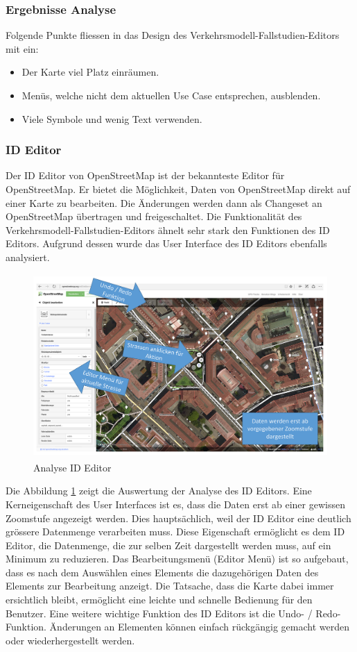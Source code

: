 \subsubsection*{Ergebnisse Analyse}
Folgende Punkte fliessen in das Design des Verkehrsmodell-Fallstudien-Editors mit ein:
\begin{itemize}
\itemsep0em
\item Der Karte viel Platz einräumen.
\item Menüs, welche nicht dem aktuellen Use Case entsprechen, ausblenden.
\item Viele Symbole und wenig Text verwenden.
\end{itemize}
\newpage
\subsubsection{ID Editor}
Der ID Editor von OpenStreetMap ist der bekannteste Editor für OpenStreetMap. Er bietet die Möglichkeit, Daten von OpenStreetMap direkt auf einer Karte zu bearbeiten. Die Änderungen werden dann als Changeset an OpenStreetMap übertragen und freigeschaltet. Die Funktionalität des Verkehrsmodell-Fallstudien-Editors ähnelt sehr stark den Funktionen des ID Editors. Aufgrund dessen wurde das User Interface des ID Editors ebenfalls analysiert.
\begin{figure}[H]
\centering
\includegraphics[height=7cm]{images/AnalyseIDEditor.png}
\caption{Analyse ID Editor}
\label{fig:ideditor}
\end{figure}
\noindent
Die Abbildung \ref{fig:ideditor} zeigt die Auswertung der Analyse des ID Editors. Eine Kerneigenschaft des User Interfaces ist es, dass die Daten erst ab einer gewissen Zoomstufe angezeigt werden. Dies hauptsächlich, weil der ID Editor eine deutlich grössere Datenmenge verarbeiten muss. Diese Eigenschaft ermöglicht es dem ID Editor, die Datenmenge, die zur selben Zeit dargestellt werden muss, auf ein Minimum zu reduzieren. Das Bearbeitungsmenü (Editor Menü) ist so aufgebaut, dass es nach dem Auswählen eines Elements die dazugehörigen Daten des Elements zur Bearbeitung anzeigt. Die Tatsache, dass die Karte dabei immer ersichtlich bleibt, ermöglicht eine leichte und schnelle Bedienung für den Benutzer. Eine weitere wichtige Funktion des ID Editors ist die Undo- / Redo-Funktion. Änderungen an Elementen können einfach rückgängig gemacht werden oder wiederhergestellt werden.
